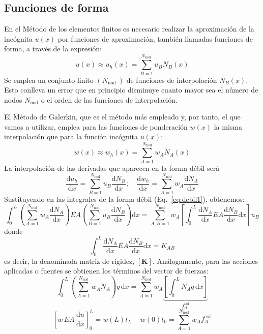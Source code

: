\documentclass[spanish,a4paper,12pt]{article}
\begin{document}
\subsection{Funciones de forma}
\label{sec:N}
En el Método de los elementos finitos es necesario realizar la aproximación de la incógnita $u(x)$ por funciones de aproximación, también llamadas funciones de forma, a través de la expresión:
\begin{equation}\label{eq:N1}
u(x) \approx u_{h}(x)=\sum_{B=1}^{N_{\text {nod }}} u_{B} N_{B}(x)
\end{equation}
Se emplea un conjunto finito $\left(N_{\text {nod }}\right)$ de funciones de interpolación $N_{B}(x)$. Esto conlleva un error que en principio disminuye cuanto mayor sea el número de nodos $N_{\text {nod}}$ o el orden de las funciones de interpolación.

El Método de Galerkin, que es el método más empleado y, por tanto, el que vamos a utilizar, emplea para las funciones de ponderación $w(x)$ la misma interpolación que para la función incógnita $u(x)$:
\begin{equation}\label{eq:N2}
w(x) \approx w_{h}(x)=\sum_{A=1}^{N_{\mathrm{nod}}} w_{A} N_{A}(x)
\end{equation}
La interpolación de las derivadas que aparecen en la forma débil será
\begin{equation}\label{eq:N3}
\frac{\mathrm{d} u_{h}}{\mathrm{d} x}=\sum_{B=1}^{N_{\mathrm{nod}}} u_{B} \frac{\mathrm{d} N_{B}}{\mathrm{d} x} ; \quad \frac{\mathrm{d} w_{h}}{\mathrm{d} x}=\sum_{A=1}^{N_{\mathrm{nod}}} w_{A} \frac{\mathrm{d} N_{A}}{\mathrm{d} x}
\end{equation}
Sustituyendo en las integrales de la forma débil (Eq.~\eqref{eq:debil1}), obtenemos:
\begin{equation}\label{eq:N4}
 \int_{0}^{L}\left(\sum_{A=1}^{N_{\mathrm{nod}}} w_{A} \frac{\mathrm{d} N_{A}}{\mathrm{d} x}\right) EA\left(\sum_{B=1}^{N_{\mathrm{nod}}} u_{B} \frac{\mathrm{d} N_{B}}{\mathrm{d} x}\right) \mathrm{d} x = \sum_{A, B=1}^{N_{\mathrm{nod}}} w_{A}\left[\left.\int_{0}^{L} \frac{\mathrm{d} N_{A}}{\mathrm{d} x} EA \frac{\mathrm{d} N_{B}}{\mathrm{d} x} \mathrm{d} x\right] u_{B}\right. 
\end{equation}
donde 
$$\int_{0}^{L} \frac{\mathrm{d} N_{A}}{\mathrm{d} x} EA \frac{\mathrm{d} N_{B}}{\mathrm{d} x} \mathrm{d} x = K_{AB}$$
es decir,  la denominada matriz de rigidez, $\left[\bm{K} \right]$. Análogamente, para las acciones aplicadas o fuentes se obtienen
los términos del vector de fuerzas:
\begin{equation}\label{eq:N5}
\int_{0}^{L}\left(\sum_{A=1}^{N_{\mathrm{nod}}} w_{A} N_{A}\right) q \,\mathrm{d} x=\sum_{A=1}^{N_{\mathrm{nod}}} w_{A} \underbrace{\left[\int_{0}^{L} N_{A} q \,\mathrm{d} x\right]}_{f_{A}^{\mathrm{vol}}}
\end{equation}
\begin{equation}\label{eq:N6}
\left[w \, EA \,\frac{\mathrm{d} u}{\mathrm{d}x} \right]^L_{0}=w(L) t_{L}-w(0) t_{0}=\sum_{A=1}^{N_{\mathrm{nod}}} w_{A} f_{A}^{\mathrm{ext}}
\end{equation}
\end{document}
